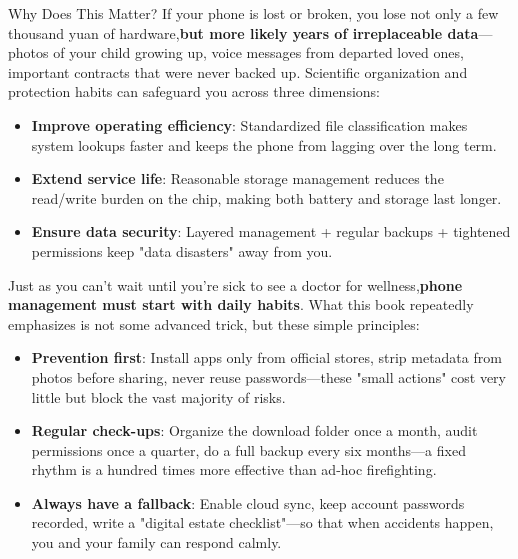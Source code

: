 \begin{tcbinfo}{Why Does This Matter?}
If your phone is lost or broken, you lose not only a few thousand yuan of hardware,\textbf{but more likely years of irreplaceable data}—photos of your child growing up, voice messages from departed loved ones, important contracts that were never backed up. Scientific organization and protection habits can safeguard you across three dimensions:

\begin{itemize}
  \item \textbf{Improve operating efficiency}: Standardized file classification makes system lookups faster and keeps the phone from lagging over the long term.
  \item \textbf{Extend service life}: Reasonable storage management reduces the read/write burden on the chip, making both battery and storage last longer.
  \item \textbf{Ensure data security}: Layered management + regular backups + tightened permissions keep "data disasters" away from you.
\end{itemize}

\end{tcbinfo}


Just as you can't wait until you're sick to see a doctor for wellness,\textbf{phone management must start with daily habits}. What this book repeatedly emphasizes is not some advanced trick, but these simple principles:

\begin{itemize}
  \item \textbf{Prevention first}: Install apps only from official stores, strip metadata from photos before sharing, never reuse passwords—these "small actions" cost very little but block the vast majority of risks.
  \item \textbf{Regular check-ups}: Organize the download folder once a month, audit permissions once a quarter, do a full backup every six months—a fixed rhythm is a hundred times more effective than ad-hoc firefighting.
  \item \textbf{Always have a fallback}: Enable cloud sync, keep account passwords recorded, write a "digital estate checklist"—so that when accidents happen, you and your family can respond calmly.
\end{itemize}
